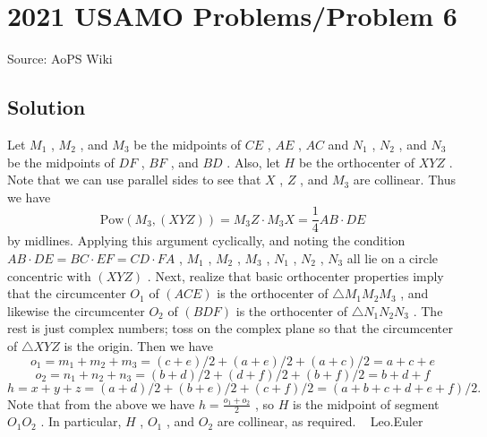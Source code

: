 \documentclass[12pt]{article}
\begin{document}
\section*{{2021 USAMO Problems/Problem 6}}
Source: AoPS Wiki

\subsection*{Solution}
Let $M_1$ , $M_2$ , and $M_3$ be the midpoints of $CE$ , $AE$ , $AC$ and $N_1$ , $N_2$ , and $N_3$ be the midpoints of $DF$ , $BF$ , and $BD$ . Also, let $H$ be the orthocenter of $XYZ$ . Note that we can use parallel sides to see that $X$ , $Z$ , and $M_3$ are collinear. Thus we have \[\text{Pow}(M_3,(XYZ)) = M_3Z \cdot M_3X = \frac 14 AB \cdot DE\] by midlines. Applying this argument cyclically, and noting the condition $AB \cdot DE = BC \cdot EF = CD \cdot FA$ , $M_1$ , $M_2$ , $M_3$ , $N_1$ , $N_2$ , $N_3$ all lie on a circle concentric with $(XYZ)$ . Next, realize that basic orthocenter properties imply that the circumcenter $O_1$ of $(ACE)$ is the orthocenter of $\triangle M_1M_2M_3$ , and likewise the circumcenter $O_2$ of $(BDF)$ is the orthocenter of $\triangle N_1N_2N_3$ . The rest is just complex numbers; toss on the complex plane so that the circumcenter of $\triangle XYZ$ is the origin. Then we have \[o_1 = m_1+m_2+m_3 = (c+e)/2+(a+e)/2+(a+c)/2=a+c+e\] \[o_2 = n_1+n_2+n_3 = (b+d)/2+(d+f)/2+(b+f)/2=b+d+f\] \[h = x+y+z = (a+d)/2+(b+e)/2+(c+f)/2=(a+b+c+d+e+f)/2.\] Note that from the above we have $h=\frac{o_1+o_2}{2}$ , so $H$ is the midpoint of segment $O_1O_2$ . In particular, $H$ , $O_1$ , and $O_2$ are collinear, as required. ~ Leo.Euler
\end{document}
